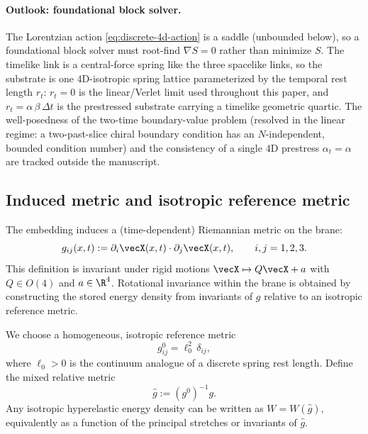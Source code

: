 \paragraph{Outlook: foundational block solver.}
The Lorentzian action \eqref{eq:discrete-4d-action} is a saddle (unbounded below), so a foundational block solver must root-find $\nabla S=0$ rather than minimize $S$.
The timelike link is a central-force spring like the three spacelike links, so the substrate is one $4$D-isotropic spring lattice parameterized by the temporal rest length $r_t$: $r_t=0$ is the linear/Verlet limit used throughout this paper, and $r_t=\alpha\,\beta\,\Delta t$ is the prestressed substrate carrying a timelike geometric quartic. The well-posedness of the two-time boundary-value problem (resolved in the linear regime: a two-past-slice chiral boundary condition has an $N$-independent, bounded condition number) and the consistency of a single $4$D prestress $\alpha_t=\alpha$ are tracked outside the manuscript.

\subsection{Induced metric and isotropic reference metric}

The embedding induces a (time-dependent) Riemannian metric on the brane:
\begin{equation}
  g_{ij}(x,t) := \partial_i \vecX(x,t)\cdot \partial_j \vecX(x,t),
  \qquad i,j=1,2,3.
  \label{eq:induced-metric}
\end{equation}
This definition is invariant under rigid motions $\vecX\mapsto Q\vecX+a$ with $Q\in O(4)$ and $a\in\R^4$.
Rotational invariance within the brane is obtained by constructing the stored energy density from invariants of $g$
relative to an isotropic reference metric.

We choose a homogeneous, isotropic reference metric
\begin{equation}
  g^0_{ij}=\ell_0^2\,\delta_{ij},
  \label{eq:reference-metric}
\end{equation}
where $\ell_0>0$ is the continuum analogue of a discrete spring rest length.
Define the mixed relative metric
\begin{equation}
  \widehat g := (g^0)^{-1}g.
  \label{eq:relative-metric}
\end{equation}
Any isotropic hyperelastic energy density can be written as $W=W(\widehat g)$, equivalently as a function of the
principal stretches or invariants of $\widehat g$.

